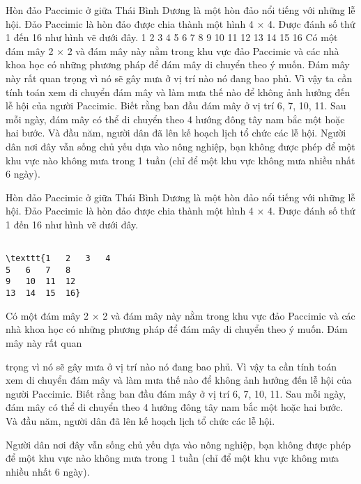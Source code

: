 Hòn đảo Paccimic ở giữa Thái Bình Dương là một hòn đảo nổi tiếng với những lễ hội. Đảo Paccimic là hòn đảo được chia thành một hình 4 × 4. Được đánh số thứ 1 đến 16 như hình vẽ dưới đây. 1 2 3 4 5 6 7 8 9 10 11 12 13 14 15 16 Có một đám mây 2 × 2 và đám mây này nằm trong khu vực đảo Paccimic và các nhà khoa học có những phương pháp để đám mây di chuyển theo ý muốn. Đám mây này rất quan trọng vì nó sẽ gây mưa ở vị trí nào nó đang bao phủ. Vì vậy ta cần tính toán xem di chuyển đám mây và làm mưa thế nào để không ảnh hưởng đến lễ hội của người Paccimic. Biết rằng ban đầu đám mây ở vị trí 6, 7, 10, 11. Sau mỗi ngày, đám mây có thể di chuyển theo 4 hướng đông tây nam bắc một hoặc hai bước. Và đầu năm, người dân đã lên kế hoạch lịch tổ chức các lễ hội. Người dân nơi đây vẫn sống chủ yếu dựa vào nông nghiệp, bạn không được phép để một khu vực nào không mưa trong 1 tuần (chỉ để một khu vực không mưa nhiều nhất 6 ngày).

Hòn đảo Paccimic ở giữa Thái Bình Dương là một hòn đảo nổi tiếng với những lễ hội. Đảo Paccimic là hòn đảo được chia thành một hình 4 × 4. Được đánh số thứ 1 đến 16 như hình vẽ dưới đây.
\begin{verbatim}

\texttt{1	2	3	4
5	6	7	8
9	10	11	12
13	14	15	16}\end{verbatim}

Có một đám mây 2 × 2 và đám mây này nằm trong khu vực đảo Paccimic và các nhà khoa học có những phương pháp để đám mây di chuyển theo ý muốn. Đám mây này rất quan

trọng vì nó sẽ gây mưa ở vị trí nào nó đang bao phủ. Vì vậy ta cần tính toán xem di chuyển đám mây và làm mưa thế nào để không ảnh hưởng đến lễ hội của người Paccimic. Biết rằng ban đầu đám mây ở vị trí 6, 7, 10, 11. Sau mỗi ngày, đám mây có thể di chuyển theo 4 hướng đông tây nam bắc một hoặc hai bước. Và đầu năm, người dân đã lên kế hoạch lịch tổ chức các lễ hội.

Người dân nơi đây vẫn sống chủ yếu dựa vào nông nghiệp, bạn không được phép để một khu vực nào không mưa trong 1 tuần (chỉ để một khu vực không mưa nhiều nhất 6 ngày).

\